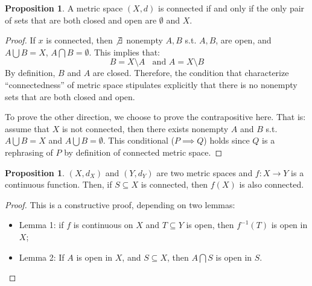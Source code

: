 \documentclass[12pt]{article}
\theoremstyle{definition}
\newtheorem{proposition}[theorem]{Proposition}
\theoremstyle{plain}
\begin{document}
\begin{proposition}
    A metric space $(X, d)$ is connected if and only if the only pair of sets
    that are both closed and open are $\emptyset$ and $X$.
    \begin{proof}
        If $x$ is connected, then $\not\exists$ nonempty $A,B$ s.t. $A, B$, are
        open, and $A \bigcup B = X$, $A \bigcap B = \emptyset$. This implies
        that:
        \[
            B = X\setminus A\;\; \text{ and } A = X \setminus B
        \]
        By definition, $B$ and $A$ are closed. Therefore, the condition that
        characterize ``connectedness'' of metric space stipulates explicitly
        that there is no nonempty sets that are both closed and open.

        To prove the other direction, we choose to prove the contrapositive
        here. That is: assume that $X$ is not connected, then  there exists
        nonempty $A$ and $B$ s.t. $A \bigcup B = X$ and $A \bigcup B =
        \emptyset$. This conditional ($P\implies Q$) holds since $Q$ is a
        rephrasing of $P$ by definition of connected metric space.
    \end{proof}
\end{proposition}

\begin{proposition}
    $(X, d_X)$ and $(Y, d_Y)$ are two metric spaces and $f: X\to Y$ is a
    continuous function. Then, if $S\subseteq X$ is connected, then $f(X)$ is
    also connected.
    \begin{proof}
        This is a constructive proof, depending on two lemmas:
        \begin{itemize}
            \item Lemma 1: if $f$ is continuous on $X$ and $T\subseteq Y$ is
                open,  then $f^{-1}(T)$ is open in $X$;
            \item Lemma 2: If $A$ is open in $X$, and $S \subseteq X$, then $A
                \bigcap S$ is open in $S$.
        \end{itemize}
    \end{proof}
\end{proposition}




\end{document}
